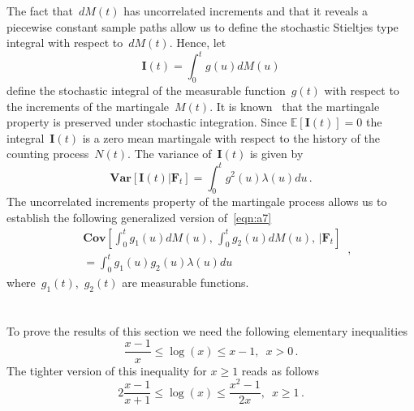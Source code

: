 \documentclass[lettersize,journal,onecolumn]{IEEEtran}
\theoremstyle{definition}
\newcommand{\E}[1]{\mathbb{E}\left[#1\right]}
\newcommand{\Var}[1]{\mathbf{Var}\left[#1\right]}
\newcommand{\Cov}[1]{\mathbf{Cov}\left[#1\right]}
\begin{document}
The fact that~$dM(t)$ has uncorrelated increments and that it reveals a piecewise 
constant sample paths allow us to define the stochastic Stieltjes type integral with 
respect to~$dM(t)$. Hence, let
\begin{equation*}
	\mathbf{I}(t) = \int_{0}^{t} g(u) dM(u)
\end{equation*}
define the stochastic integral of the measurable function~$g(t)$ with respect to the
increments of the martingale~$M(t)$. It is known~\cite{andersen2012statistical} that 
the martingale property is preserved under stochastic integration. Since 
\mbox{$\E{\mathbf{I}(t)}=0$} the integral~$\mathbf{I}(t)$ is a zero mean martingale 
with respect to the history of the counting process~$N(t)$. The variance 
of~$\mathbf{I}(t)$ is given by
\begin{equation}
	\Var{\mathbf{I}(t)|\mathbf{F}_t} =
	\int_{0}^{t} g^2(u) \lambda(u) du
	\label{eqn:a7} \,.
\end{equation}
The uncorrelated increments property of the martingale process allows us to establish 
the following generalized version of~\eqref{eqn:a7}
\begin{equation}
	\begin{split}
		& \Cov{\int_{0}^{t}g_1(u)dM(u),\,\int_{0}^{t}g_2(u)dM(u),\,|\mathbf{F}_t} \\
		& = \int_{0}^{t} g_1(u) g_2(u) \lambda(u) du
	\end{split}
	\label{eqn:a8} \,,
\end{equation}
where~$g_1(t)$,~$g_2(t)$ are measurable functions.

\section{}
\label{app:B}

To prove the results of this section we need the following elementary inequalities
\begin{equation}
	\frac{x-1}{x} \leq \log(x) \leq x-1,
	\enspace
	x>0
	\label{eqn:b1}\,.
\end{equation}
The tighter version of this inequality for $x\geq1$ reads as follows
\begin{equation}
	2\frac{x-1}{x+1} \leq \log(x) \leq \frac{x^2-1}{2x},
	\enspace
	x\geq1
	\label{eqn:b2}\,.
\end{equation}
\end{document}
